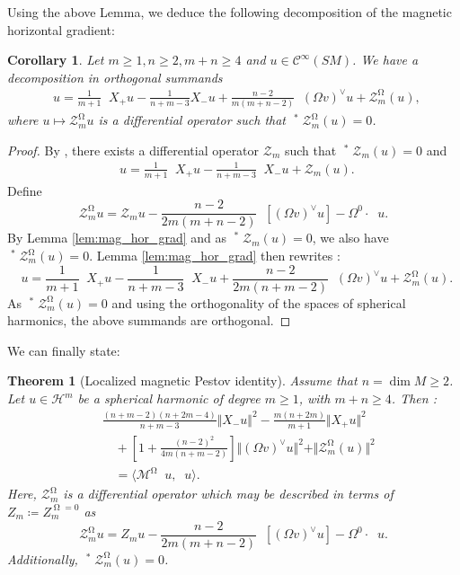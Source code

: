 \documentclass[12pt]{amsart}
\numberwithin{numbering}{section}
\theoremstyle{plain}
\newtheorem{thm}[numbering]{Theorem}
\newtheorem{csq}[numbering]{Corollary}
\theoremstyle{definition}
\theoremstyle{remark}
\numberwithin{equation}{section}
\DeclareMathOperator{\nv}{\nabla_{\mathbb{V}}}
\DeclareMathOperator{\nh}{\nabla_{\mathbb{H}}}
\DeclareMathOperator{\nhs}{\nabla_{\mathbb{H}^{\mg}}}
\DeclareMathOperator{\mg}{\Omega}
\begin{document}
Using the above Lemma, we deduce the following decomposition of the magnetic horizontal gradient:
\begin{csq} \label{cor:decomp_hor_grad}
Let $m \geq 1, n \geq 2, m + n \geq 4$ and $u \in \mathcal{C}^\infty(SM)$. We have a decomposition in orthogonal summands 
\begin{align*}
\nhs u = \frac{1}{m+1} \nv X_+ u - \frac{1}{n+m-3} X_- u 
+ \frac{n-2}{m(m+n-2)} \nv (\Omega v)^\vee u + \mathcal{Z}^{\mg}_m(u),
\end{align*}
where $u \mapsto \mathcal{Z}^{\mg}_m u$ is a differential operator such that $\nv^* \mathcal{Z}^{\mg}_m(u) = 0$.
\end{csq}

\begin{proof}
By \cite[Lemma 14.3.3]{lefeuvre2024microlocal}, there exists a differential operator $\mathcal{Z}_m$ such that $\nv^* \mathcal{Z}_m(u) = 0$ and
\begin{align*}
\nh u  = \frac{1}{m+1} \nv X_+ u - \frac{1}{n+m-3} \nv X_- u + \mathcal{Z}_m(u).
\end{align*}
Define 
$$\mathcal{Z}_m^{\mg} u = \mathcal{Z}_m u - \frac{n-2}{2m(m+n-2)} \nv [(\Omega v)^\vee u] - \Omega^0 \cdot \nv u.$$
By Lemma \ref{lem:mag_hor_grad} and as $\nv^* \mathcal{Z}_m(u) = 0$, we also have $\nv^* \mathcal{Z}_m^{\mg}(u) = 0$. Lemma \ref{lem:mag_hor_grad} then rewrites : 
$$\nhs u  = \frac{1}{m+1} \nv X_+ u - \frac{1}{n+m-3} \nv X_- u + \frac{n-2}{2m(n+m-2)} \nv (\Omega v)^\vee u + \mathcal{Z}_m^{\mg}(u).$$
As $\nv^* \mathcal{Z}_m^{\mg}(u) = 0$ and using the orthogonality of the spaces of spherical harmonics, the above summands are orthogonal.
\end{proof}

We can finally state:

\begin{thm}[Localized magnetic Pestov identity]
Assume that $n = \dim M \geq 2$. Let $u \in \mathcal{H}^m$ be a spherical harmonic of degree $m \geq 1$, with $m + n \geq 4$. Then :
\begin{align*}
&\frac{(n+m-2)(n+2m-4)}{n+m-3} \Vert X_- u \Vert^2 - \frac{m(n+2m)}{m+1} \Vert X_+ u \Vert^2 \\
&\quad + \left [1 + \frac{(n-2)^2}{4m(n+m-2)} \right ] \Vert (\Omega v)^\vee u \Vert^2 + \Vert \mathcal{Z}_m^{\mg}(u) \Vert^2 \\
&\quad = \langle \mathcal{M}^{\mg} \nv u, \nv u \rangle.
\end{align*}
Here, $\mathcal{Z}_m^{\mg}$ is a differential operator which may be described in terms of $Z_m \coloneq Z^{\mg = 0}_m$ as
$$\mathcal{Z}_m^{\mg} u = Z_m u - \frac{n-2}{2m(m+n-2)} \nv [(\Omega v)^\vee u] - \Omega^0 \cdot \nv u.$$
Additionally, $\nv^* \mathcal{Z}_m^{\mg}(u) = 0$.
\end{thm}
\end{document}
